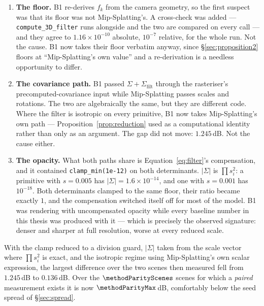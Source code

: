 \begin{enumerate}[leftmargin=1.4em,itemsep=3pt]
  \item \textbf{The floor.} B1 re-derives $f_k$ from the camera geometry, so the
        first suspect was that its floor was not Mip-Splatting's. A cross-check
        was added --- \texttt{compute\_3D\_filter} runs alongside and the two are
        compared on every call --- and they agree to $1.16\times10^{-10}$
        absolute, $10^{-7}$ relative, for the whole run. Not the cause. B1 now
        takes their floor verbatim anyway, since \S\ref{sec:proposition2} floors
        at ``Mip-Splatting's own value'' and a re-derivation is a needless
        opportunity to differ.
  \item \textbf{The covariance path.} B1 passed $\Sigma + \Sigma_{\mathrm{filt}}$
        through the rasteriser's precomputed-covariance input while
        Mip-Splatting passes scales and rotations. The two are algebraically the
        same, but they are different code. Where the filter is isotropic on
        every primitive, B1 now takes Mip-Splatting's own path ---
        Proposition~\ref{prop:reduction} used as a computational identity rather
        than only as an argument. The gap did not move: $1.245$\,dB. Not the
        cause either.
  \item \textbf{The opacity.} What both paths share is
        Equation~\eqref{eq:filter}'s compensation, and it contained
        \texttt{clamp\_min(1e-12)} on both determinants. $|\Sigma|$ is
        $\prod s_i^2$: a primitive with $s = 0.005$ has $|\Sigma| = 1.6\times
        10^{-14}$, and one with $s=0.001$ has $10^{-18}$. Both determinants
        clamped to the same floor, their ratio became exactly $1$, and the
        compensation switched itself off for most of the model. B1 was rendering
        with uncompensated opacity while every baseline number in this thesis
        was produced with it --- which is precisely the observed signature:
        denser and sharper at full resolution, worse at every reduced scale.
\end{enumerate}

With the clamp reduced to a division guard, $|\Sigma|$ taken from the scale
vector where $\prod s_i^2$ is exact, and the isotropic regime using
Mip-Splatting's own scalar expression, the largest difference over the two scenes
then measured fell from $1.245$\,dB to $0.136$\,dB. Over the
$\methodParityScenes$ scenes for which a \emph{paired} measurement exists it is
now $\mathbf{\methodParityMax}$\,dB, comfortably below the seed spread of
\S\ref{sec:spread}.

